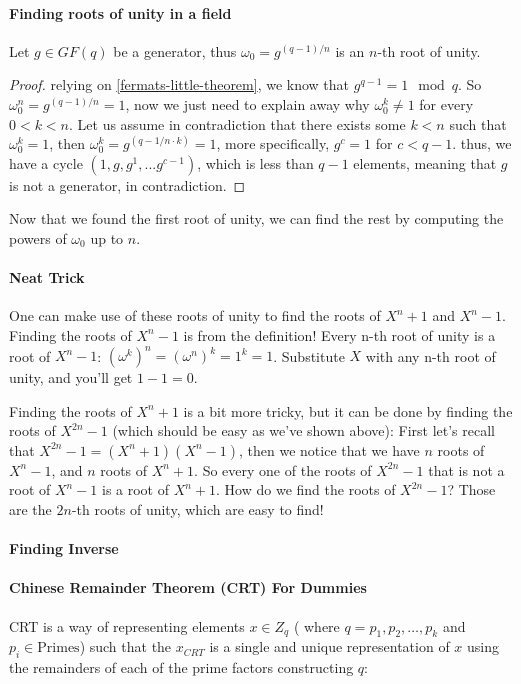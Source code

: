 \paragraph{Finding roots of unity in a field}

\begin{thm}
  Let $g\in GF(q)$ be a generator, thus
  $\omega_0=g^{(q-1)/n}$ is an $n$-th root of unity.
\end{thm}
\begin{proof}
  relying on \autoref{fermats-little-theorem}, we know that $g^{q-1}=1 \mod q$.
  So $\omega_0^n=g^{(q-1)/n}=1$, now we just need to explain away why $\omega_0^k \ne 1$ for 
  every $0<k<n$.
  Let us assume in contradiction that there exists some $k<n$ such that $\omega_0^k=1$, then 
  $\omega_0^k=g^{(q-1/n\cdot k)}=1$, more specifically, $g^c=1$ for $c<q-1$. thus, we have a 
  cycle $(1,g,g^1,...g^{c-1})$, which is less than $q-1$ elements, meaning that $g$ is not 
  a generator, in contradiction.
\end{proof}

Now that we found the first root of unity, we can find the rest by computing the powers of $\omega_0$ up to $n$.
\paragraph{Neat Trick}
One can make use of these roots of unity to find the roots of $X^n+1$ and $X^n-1$.
Finding the roots of $X^n-1$ is from the definition! 
Every n-th root of unity is a root of $X^n-1$: $(\omega^k)^n=(\omega^n)^k=1^k=1$.
Substitute $X$ with any n-th root of unity, and you'll get $1-1=0$.

Finding the roots of $X^n+1$ is a bit more tricky,
but it can be done by finding the roots of $X^{2n}-1$ (which should be easy
as we've shown above):
First let's recall that $X^{2n}-1=(X^n+1)(X^n-1)$, then we notice that
we have $n$ roots of $X^n-1$,
and $n$ roots of $X^n+1$. So every one of the roots of $X^{2n}-1$ that is
not a root of $X^n-1$ is a root of $X^n+1$.
How do we find the roots of $X^{2n}-1$? Those are the $2n$-th roots of unity, 
which are easy to find!

\paragraph{\bf Finding Inverse}


\paragraph{\bf Chinese Remainder Theorem (CRT) For Dummies}
CRT is a way of representing elements $x\in Z_q$ (
  where $q=p_1,p_2,\dots,p_k$ and $p_i\in\text{Primes}$)
such that the $x_{CRT}$ is a single and unique representation of $x$ using the 
remainders of each of the prime factors constructing $q$:

